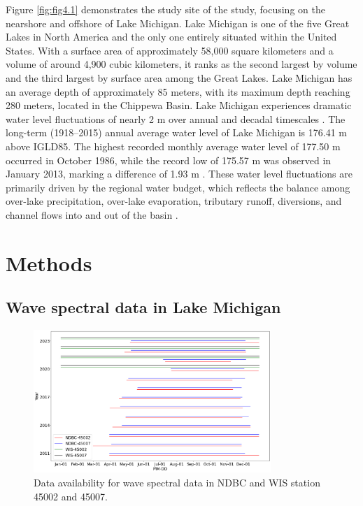 Figure \ref{fig:fig4.1} demonstrates the study site of the study, focusing on
the nearshore and offshore of Lake Michigan. Lake Michigan is one of the five
Great Lakes in North America and the only one entirely situated within the
United States. With a surface area of approximately 58,000 square kilometers and
a volume of around 4,900 cubic kilometers, it ranks as the second largest by
volume and the third largest by surface area among the Great Lakes. Lake
Michigan has an average depth of approximately 85 meters, with its maximum depth
reaching 280 meters, located in the Chippewa Basin. Lake Michigan experiences
dramatic water level fluctuations of nearly 2 m over annual and decadal
timescales \citep{quinn1990lake,gronewold2014water}. The long-term (1918–2015)
annual average water level of Lake Michigan is 176.41 m above IGLD85. The
highest recorded monthly average water level of 177.50 m occurred in October
1986, while the record low of 175.57 m was observed in January 2013, marking a
difference of 1.93 m \citep{gronewold2013dynamic}. These water level
fluctuations are primarily driven by the regional water budget, which reflects
the balance among over-lake precipitation, over-lake evaporation, tributary
runoff, diversions, and channel flows into and out of the basin
\citep{gronewold_hydrological_2016}.

\section{Methods}
\label{c4_methods}

\subsection{Wave spectral data in Lake Michigan}
\label{Wave spectral data in Lake Michigan}

\begin{figure}[htbp]
  \centering
  \includegraphics[width=0.8\textwidth]{chapter4/resources/figure4-2.png}
  \caption{Data availability for wave spectral data in NDBC and WIS station 45002 and 45007.}
  \label{fig:fig4.2}
\end{figure}


